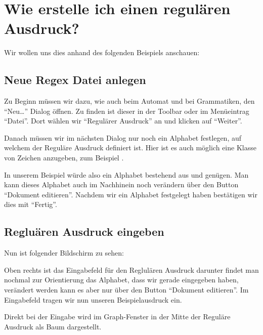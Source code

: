 \chapter{Wie erstelle ich einen regulären Ausdruck?}

Wir wollen uns dies anhand des folgenden Beispiels anschauen: 

\section{Neue Regex Datei anlegen}

Zu Beginn müssen wir dazu, wie auch beim Automat und bei Grammatiken, den "`Neu\ldots"' Dialog öffnen. Zu finden ist dieser in der Toolbar oder im Menüeintrag "`Datei"'. Dort wählen wir "`Regulärer Ausdruck"' an und klicken auf "`Weiter"'.\vspace{10pt}

Danach müssen wir im nächsten Dialog nur noch ein Alphabet festlegen, auf welchem der Reguläre Ausdruck definiert ist. Hier ist es auch möglich eine Klasse von Zeichen anzugeben, zum Beispiel \Symbol{[a-z]}.\vspace{10pt}

In unserem Beispiel würde also ein Alphabet bestehend aus  und  genügen. Man kann dieses Alphabet auch im Nachhinein noch verändern über den Button "`Dokument editieren"'. Nachdem wir ein Alphabet festgelegt haben bestätigen wir dies mit "`Fertig"'.\vspace{10pt}

\section{Regluären Ausdruck eingeben}

Nun ist folgender Bildschirm zu sehen:\vspace{10pt}

Oben rechts ist das Eingabefeld für den Reglulären Ausdruck darunter findet man nochmal zur Orientierung das Alphabet, dass wir gerade eingegeben haben, verändert werden kann es aber nur über den Button "`Dokument editieren"'. Im Eingabefeld tragen wir nun unseren Beispielausdruck  ein.\vspace{10pt}

Direkt bei der Eingabe wird im Graph-Fenster in der Mitte der Reguläre Ausdruck als Baum dargestellt.
